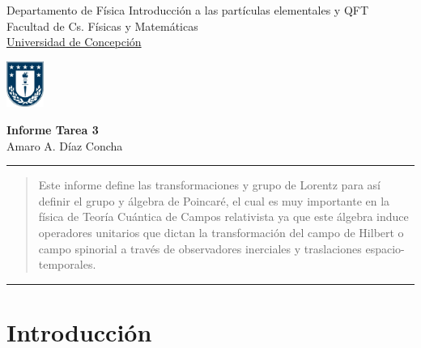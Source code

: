 \documentclass[12pt,letterpaper]{article}
\begin{document}

\usetikzlibrary{positioning}
\pagestyle{plain}
\begin{flushleft}
Departamento de Física \hfill Introducción a las partículas elementales y QFT\\
Facultad de Cs. Físicas y Matemáticas\\
\underline{Universidad de Concepción}
\end{flushleft}

\begin{flushright}\vspace{-5mm}
\includegraphics[height=1.5cm]{escudo .jpg}
\end{flushright}
 
\begin{center}\vspace{-1cm}
\textbf{\large Informe Tarea 3}\\   %
Amaro A. Díaz Concha\\                         %
\end{center}
\rule{\linewidth}{0.1mm}

 


\begin{abstract}
  Este informe define las transformaciones y grupo de Lorentz para así definir el grupo y álgebra de Poincaré, el cual es muy importante en la física de Teoría Cuántica de Campos relativista ya que este álgebra induce operadores unitarios que dictan la transformación del campo de Hilbert o campo spinorial a través de observadores inerciales y traslaciones espacio-temporales.
\end{abstract}
\rule{\linewidth}{0.1mm}
\section{Introducción}
\end{document}
